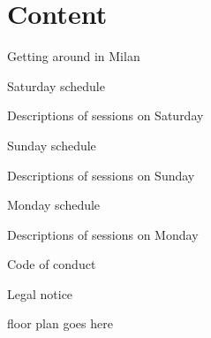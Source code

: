 \section*{Content}

\vspace*{0.35em}%
\noindent Getting around in Milan\dotfill \pageref{milan}

\vspace*{0.35em}%
\noindent Saturday schedule\dotfill \pageref{saturday}

\vspace*{0.35em}%
\noindent Descriptions of sessions on Saturday \dotfill \pageref{saturday-abstracts}

\vspace*{0.35em}%
\noindent Sunday schedule \dotfill \pageref{sunday}

\vspace*{0.35em}%
\noindent Descriptions of sessions on Sunday \dotfill \pageref{sunday-abstracts}

\vspace*{0.35em}%
\noindent Monday schedule \dotfill \pageref{monday}

\vspace*{0.35em}%
\noindent Descriptions of sessions on Monday \dotfill \pageref{monday-abstracts}

\vspace*{0.35em}%
\noindent Code of conduct \dotfill \pageref{coc}

\vspace*{0.35em}%
\noindent Legal notice \dotfill \pageref{legal}

\vfill
floor plan goes here

\newpage
